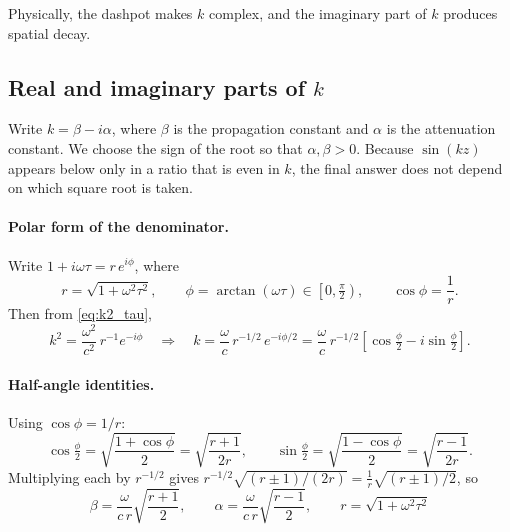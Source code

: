 Physically, the dashpot makes $k$ complex, and the imaginary part of $k$
produces spatial decay.

\subsection{Real and imaginary parts of \texorpdfstring{$k$}{k}}

Write $k = \beta - i\alpha$, where $\beta$ is the propagation constant and
$\alpha$ is the attenuation constant. We choose the sign of the root so that
$\alpha, \beta > 0$. Because $\sin(kz)$ appears below only in a ratio that is
even in $k$, the final answer does not depend on which square root is taken.

\paragraph{Polar form of the denominator.}
Write $1 + i\omega\tau = r\,e^{i\phi}$, where
\begin{equation}
  r = \sqrt{1 + \omega^2\tau^2}, \qquad
  \phi = \arctan(\omega\tau) \in \left[0, \tfrac{\pi}{2}\right),
  \qquad
  \cos\phi = \frac{1}{r}.
  \label{eq:polar}
\end{equation}
Then from \cref{eq:k2_tau},
\begin{equation}
  k^2 = \frac{\omega^2}{c^2}\, r^{-1} e^{-i\phi}
  \quad\Longrightarrow\quad
  k = \frac{\omega}{c}\, r^{-1/2}\, e^{-i\phi/2}
    = \frac{\omega}{c}\, r^{-1/2}\left[\cos\tfrac{\phi}{2} - i\sin\tfrac{\phi}{2}\right].
\end{equation}

\paragraph{Half-angle identities.}
Using $\cos\phi = 1/r$:
\begin{equation}
  \cos\tfrac{\phi}{2} = \sqrt{\frac{1+\cos\phi}{2}} = \sqrt{\frac{r+1}{2r}},
  \qquad
  \sin\tfrac{\phi}{2} = \sqrt{\frac{1-\cos\phi}{2}} = \sqrt{\frac{r-1}{2r}}.
\end{equation}
Multiplying each by $r^{-1/2}$ gives $r^{-1/2}\sqrt{(r\pm1)/(2r)} = \frac{1}{r}\sqrt{(r\pm1)/2}$, so
\begin{equation}
  \boxed{\;
  \beta = \frac{\omega}{c\,r}\sqrt{\frac{r+1}{2}},
  \qquad
  \alpha = \frac{\omega}{c\,r}\sqrt{\frac{r-1}{2}},
  \qquad
  r = \sqrt{1+\omega^2\tau^2}
  \;}
  \label{eq:alpha_beta}
\end{equation}

